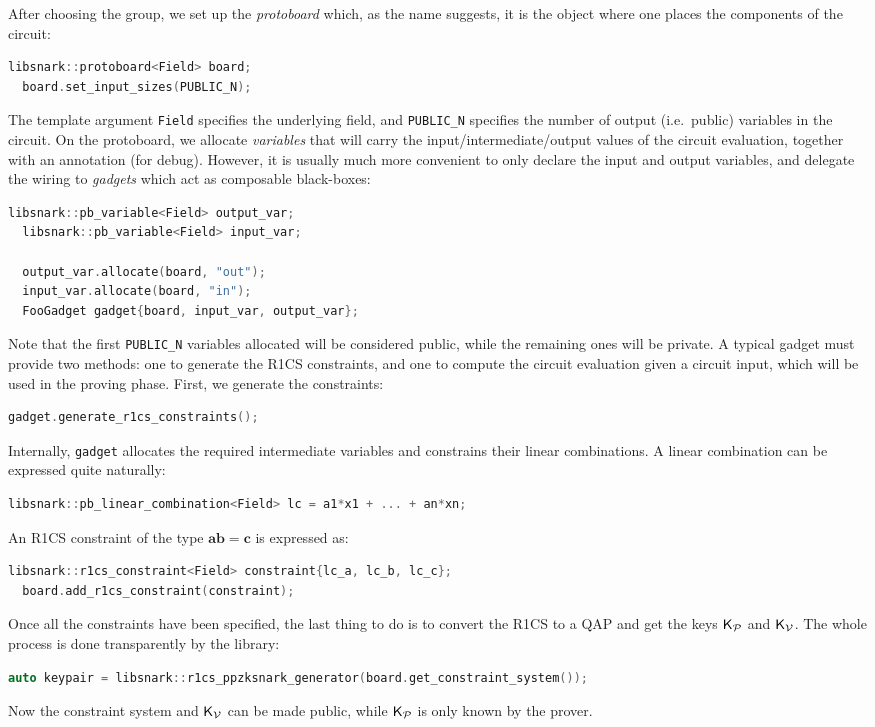 After choosing the group, we set up the \emph{protoboard} which, as the 
name suggests, it is the object where one places the components of the circuit:
\begin{lstlisting}[language=C++]
  libsnark::protoboard<Field> board;
  board.set_input_sizes(PUBLIC_N);
\end{lstlisting}
The template argument \texttt{Field} specifies the underlying field, and \texttt{PUBLIC\_N} 
specifies the number of output (i.e.\ public) variables in the circuit.
On the protoboard, we allocate \emph{variables} that will carry the input/intermediate/output
values of the circuit evaluation, together with an annotation (for debug).
However, it is usually much more convenient to only declare the input and output variables, and 
delegate the wiring to \emph{gadgets} which act as composable black-boxes:
\begin{lstlisting}[language=C++]
  libsnark::pb_variable<Field> output_var;
  libsnark::pb_variable<Field> input_var;

  output_var.allocate(board, "out");
  input_var.allocate(board, "in");
  FooGadget gadget{board, input_var, output_var};
\end{lstlisting}
Note that the first \texttt{PUBLIC\_N} variables allocated will be considered public, while the 
remaining ones will be private.
A typical gadget must provide two methods: one to generate the R1CS constraints, and one to 
compute the circuit evaluation given a circuit input, which will be used in the proving phase.
First, we generate the constraints:
\begin{lstlisting}[language=C++]
  gadget.generate_r1cs_constraints();
\end{lstlisting}
Internally, \texttt{gadget} allocates the required intermediate variables and constrains their 
linear combinations. 
A linear combination can be expressed quite naturally:
\begin{lstlisting}[language=C++] 
  libsnark::pb_linear_combination<Field> lc = a1*x1 + ... + an*xn;
\end{lstlisting}
An R1CS constraint of the type \(\bm{ab} = \bm{c}\) is expressed as:
\begin{lstlisting}[language=C++]
  libsnark::r1cs_constraint<Field> constraint{lc_a, lc_b, lc_c};
  board.add_r1cs_constraint(constraint);
\end{lstlisting}
Once all the constraints have been specified, the last thing to do is to convert the R1CS to a 
QAP and get the keys \(\mathsf{K}_\mathcal{P} \) and \(\mathsf{K}_\mathcal{V} \).
The whole process is done transparently by the library:
\begin{lstlisting}[language=C++]
  auto keypair = libsnark::r1cs_ppzksnark_generator(board.get_constraint_system());
\end{lstlisting}
Now the constraint system and \(\mathsf{K}_\mathcal{V} \) can be made public, while \(\mathsf{K}_\mathcal{P} \) is only 
known by the prover. 

